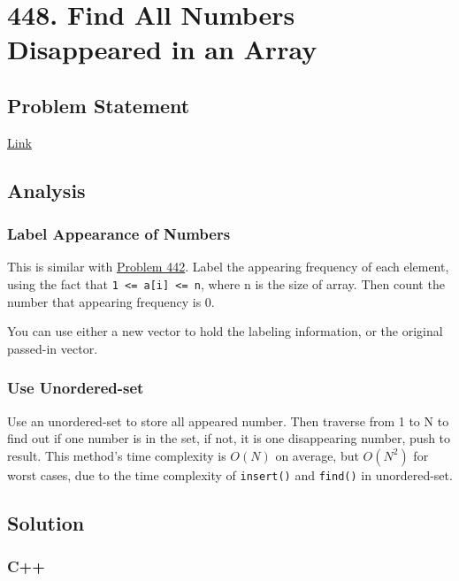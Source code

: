\documentclass[12pt]{article}
\begin{document}
\section{448. Find All Numbers Disappeared in an Array}
\label{sec:org35af1db}
\subsection{Problem Statement}
\label{sec:org7379558}
\href{https://leetcode.com/problems/find-all-numbers-disappeared-in-an-array/}{Link}
\subsection{Analysis}
\label{sec:org8c9bcf4}
\subsubsection{Label Appearance of Numbers}
\label{sec:orge65ba42}
This is similar with \hyperref[orgc536669]{Problem 442}. Label the appearing frequency of each element, using the fact that \texttt{1 <= a[i] <= n}, where n is the size of array. Then count the number that appearing frequency is 0.

You can use either a new vector to hold the labeling information, or the original passed-in vector.

\subsubsection{Use Unordered-set}
\label{sec:org9519499}
Use an unordered-set to store all appeared number. Then traverse from 1 to N to find out if one number is in the set, if not, it is one disappearing number, push to result. This method's time complexity is \(O(N)\) on average, but \(O(N^2)\) for worst cases, due to the time complexity of \texttt{insert()} and \texttt{find()} in unordered-set.

\subsection{Solution}
\label{sec:org04396d8}
\subsubsection{C++}
\label{sec:orgd7edede}
\end{document}
